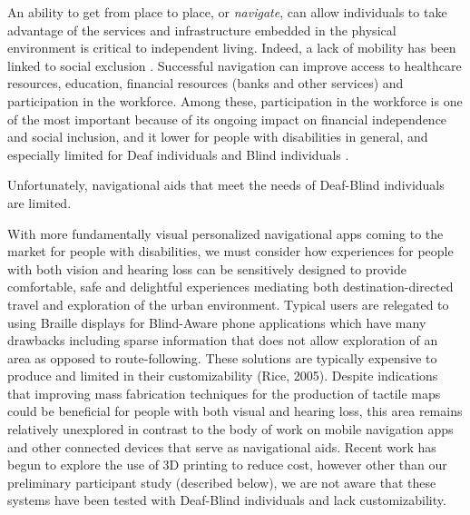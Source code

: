 

An ability to get from place to place, or \textit{navigate}, can allow individuals to take advantage of the  services and infrastructure embedded in the physical environment is critical to independent living. Indeed, a lack of mobility has been linked to social exclusion \cite{kenyon2002transport}.  Successful navigation can improve access to healthcare resources, education, financial resources (banks and other services) and participation in the workforce. Among these, participation in the workforce is one of the most important because of its ongoing impact on financial independence and social inclusion, and it lower for people with disabilities in general, and especially limited for Deaf individuals and Blind individuals \cite{zwerling2002workforce}.

Unfortunately,  navigational aids that meet the needs of  Deaf-Blind individuals are limited.

With more fundamentally visual personalized navigational apps coming to the market for people with disabilities, we must consider how experiences for people with both vision and hearing loss can be sensitively designed to provide comfortable, safe and delightful experiences mediating both destination-directed travel and exploration of the urban environment. 
Typical users are relegated to using Braille displays for Blind-Aware phone applications which have many drawbacks including sparse information that does not allow exploration of an area as opposed to route-following.
These solutions are typically expensive to produce and limited in their customizability (Rice, 2005). Despite indications that improving mass fabrication techniques for the production of tactile maps could be beneficial for people with both visual and hearing loss, this area remains relatively unexplored in contrast to the body of work on mobile navigation apps and other connected devices that serve as navigational aids.
Recent work has begun to explore the use of 3D printing to reduce cost, however other than our preliminary participant study (described below), we are not aware that these systems have been tested with Deaf-Blind individuals and lack customizability. 

